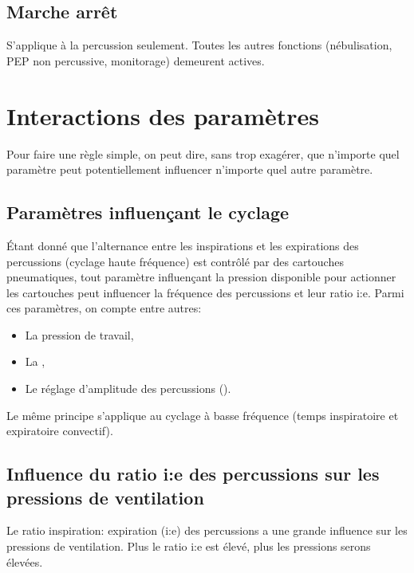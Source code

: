 \subsection{Marche arrêt}

S'applique à la percussion seulement. Toutes les autres fonctions
(nébulisation, PEP non percussive, monitorage) demeurent actives.

\section{Interactions des paramètres}

Pour faire une règle simple, on peut dire, sans trop exagérer, que
n'importe quel paramètre peut potentiellement influencer n'importe
quel autre paramètre. 

\subsection{Paramètres influençant le cyclage}

Étant donné que l'alternance entre les inspirations et les expirations
des percussions (cyclage haute fréquence)  est contrôlé par des
cartouches pneumatiques, tout paramètre influençant la pression
disponible pour actionner les cartouches peut influencer la fréquence
des percussions et leur ratio i:e.  Parmi ces paramètres, on compte
entre autres:

\begin{itemize} \item La pression de travail, \item La \fio, \item Le
réglage d'amplitude des percussions ().
\end{itemize}

Le même principe s'applique au cyclage à basse fréquence (temps
inspiratoire et expiratoire convectif).

\subsection{Influence du ratio i:e des percussions sur les pressions
de ventilation}

Le ratio inspiration: expiration (i:e) des percussions a une grande
influence sur les pressions de ventilation. Plus le ratio i:e est
élevé, plus les pressions serons élevées.

